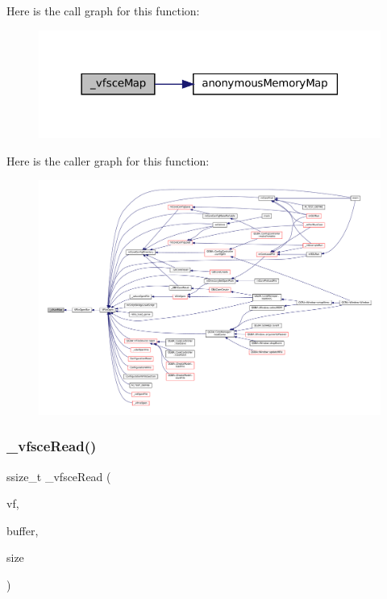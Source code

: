Here is the call graph for this function\+:
\nopagebreak
\begin{figure}[H]
\begin{center}
\leavevmode
\includegraphics[width=318pt]{sce-vfs_8c_a7a2054da859a0182af242a8a0eb6d50d_cgraph}
\end{center}
\end{figure}
Here is the caller graph for this function\+:
\nopagebreak
\begin{figure}[H]
\begin{center}
\leavevmode
\includegraphics[width=350pt]{sce-vfs_8c_a7a2054da859a0182af242a8a0eb6d50d_icgraph}
\end{center}
\end{figure}
\mbox{\label{sce-vfs_8c_a69b43cfbd3986b033257e6363f8d531f}} 
\subsubsection{\texorpdfstring{\+\_\+vfsce\+Read()}{\_vfsceRead()}}
{\footnotesize\ttfamily ssize\+\_\+t \+\_\+vfsce\+Read (\begin{DoxyParamCaption}\item[{struct V\+File $\ast$}]{vf,  }\item[{void $\ast$}]{buffer,  }\item[{size\+\_\+t}]{size }\end{DoxyParamCaption})\hspace{0.3cm}{\ttfamily [static]}}

